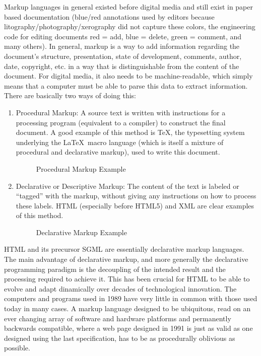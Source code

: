 Markup languages in general existed before digital media and still exist in paper based documentation (blue/red annotations used by editors because litography/photography/xerography did not capture these colors, the engineering code for editing documents red = add, blue = delete, green = comment, and many others). In general, markup is a way to add information regarding the document's structure, presentation, state of development, comments, author, date, copyright, etc. in a way that is distinguishable from the content of the document. For digital media, it also needs to be machine-readable, which simply means that a computer must be able to parse this data to extract information. There are basically two ways of doing this:
\begin{enumerate}
	\item Procedural Markup: A source text is written with instructions for a processing program (equivalent to a compiler) to construct the final document. A good example of this method is \TeX, the typesetting system underlying the \LaTeX\ macro language (which is itself a mixture of procedural and declarative markup), used to write this document.
	\begin{figure}[ht]
    \caption{Procedural Markup Example}
	\end{figure}
	\item Declarative or Descriptive Markup: The content of the text is labeled or ``tagged'' with the markup, without giving any instructions on how to process these labels. HTML (especially before HTML5) and XML are clear examples of this method.
	\begin{figure}[ht]
    \caption{Declarative Markup Example}
	\end{figure}
\end{enumerate}
HTML and its precursor SGML are essentially declarative markup languages. The main advantage of declarative markup, and more generally the declarative programming paradigm is the decoupling of the intended result and the processing required to achieve it. This has been crucial for HTML to be able to evolve and adapt dinamically over decades of technological innovation. The computers and programs used in 1989 have very little in common with those used today in many cases. A markup language designed to be ubiquitous, read on an ever changing array of software and hardware platforms and permanently backwards compatible, where a web page designed in 1991 is just as valid as one designed using the last specification, has to be as procedurally oblivious as possible.\\

